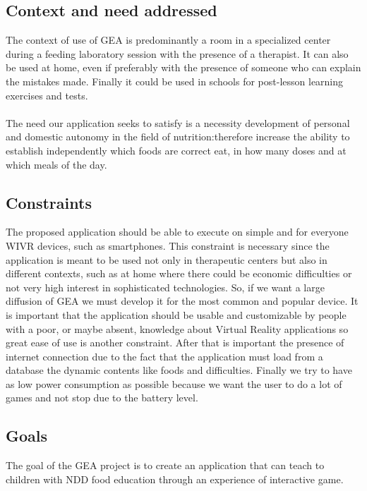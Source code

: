 \subsection{Context and need addressed}
The context of use of GEA is predominantly a room in a specialized center during
a feeding laboratory session with the presence of a therapist. It can also be used at home, even if preferably with the presence of someone who can explain the mistakes made. Finally it could be used in schools for post-lesson learning exercises and tests.\\
\\
The need our application seeks to satisfy is a necessity development of personal and domestic autonomy in the field of nutrition:therefore increase the ability to establish independently which foods are correct
eat, in how many doses and at which meals of the day.
\subsection{Constraints}
The proposed application should be able to execute on simple and for everyone WIVR devices, such as smartphones. This constraint is necessary since the application is meant to be used not only in therapeutic centers but also in different contexts, such as at home where there could be economic difficulties or not very high interest in sophisticated technologies. So, if we want a large diffusion of GEA we must develop it for the most common and popular device. It is important that the application should be usable and customizable by people with a poor, or maybe absent, knowledge about Virtual Reality applications so great ease of use is another constraint. After that is important the presence of internet connection due to the fact that the application must load from a database the dynamic contents like foods and difficulties. Finally we try to have as low power consumption as possible because we want the user to do a lot of games and not stop due to the battery level.
\subsection{Goals}
The goal of the GEA project is to create an application that can teach to children with NDD food education through an experience of interactive game.
